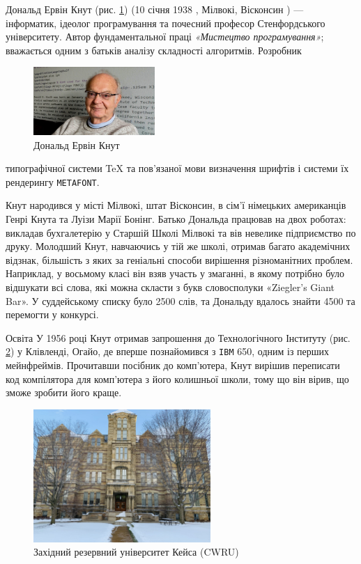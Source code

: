 \documentclass[a4paper]{report}
\begin{document}
\pagestyle{empty}
    Дональд Ервін Кнут (рис. \ref{fig:knuth}) (10 січня 1938 , Мілвокі, Вісконсин ) --- інформатик, ідеолог програмування та почесний професор 
    Стенфордського університету. Автор фундаментальної праці \textit{«Мистецтво програмування»}; вважається одним з батьків аналізу 
    складності алгоритмів. Розробник
    \begin{figure}
        \vspace{-15pt}
        \centering
        \includegraphics[width=0.41\textwidth]{Pictures/Knuth.jpeg}
        \caption{Дональд Ервін Кнут}
        \label{fig:knuth}
        \vspace{-15pt}
    \end{figure}
    типографічної системи \TeX{} та пов'язаної мови визначення шрифтів і системи їх рендерингу \texttt{METAFONT}.

    Кнут народився у місті Мілвокі, штат Вісконсин, в сім'ї німецьких американців Генрі Кнута та Луізи Марії Бонінг. 
    Батько Дональда працював на двох роботах: викладав бухгалетерію у Старшій Школі Мілвокі та вів невелике підприємство по друку. 
    Молодший Кнут, навчаючись у тій же школі, отримав багато академічних відзнак, більшість з яких за геніальні способи 
    вирішення різноманітних проблем. Наприклад, у восьмому класі він взяв участь у змаганні, в якому потрібно було відшукати 
    всі слова, які можна скласти з букв словосполуки «Ziegler's Giant Bar». У суддейському списку було 2500 слів, та Дональду 
    вдалось знайти 4500 та перемогти у конкурсі.

    Освіта У 1956 році Кнут отримав запрошення до Технологічного Інституту (рис. \ref{fig:CWRU}) у Клівленді, Огайо, де вперше познайомився з \texttt{IBM} 650, одним 
    із перших мейнфреймів. Прочитавши посібник до комп'ютера, Кнут вирішив переписати код компілятора для комп'ютера з його колишньої школи, тому що
    він вірив, що зможе зробити його краще.

    \begin{figure}
        \centering
        \includegraphics[width=0.6\textwidth]{Pictures/CWRU.jpg}
        \caption{Західний резервний університет Кейса (CWRU)}
        \label{fig:CWRU}
    \end{figure}
\end{document}
